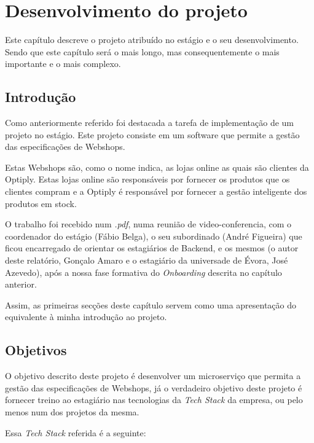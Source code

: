\chapter{Desenvolvimento do projeto}\label{cap4}

Este capítulo descreve o projeto atribuído no estágio e o seu desenvolvimento. Sendo que este capítulo será o mais longo, mas consequentemente o mais importante e o mais complexo.

\section{Introdução}

Como anteriormente referido foi destacada a tarefa de implementação de um projeto no estágio. Este projeto consiste em um software que permite a gestão das especificações de Webshops.

Estas Webshops são, como o nome indica, as lojas online as quais são clientes da Optiply. Estas lojas online são responsáveis por fornecer os produtos que os clientes compram e a Optiply é responsável por fornecer a gestão inteligente dos produtos em stock.

O trabalho foi recebido num \textit{.pdf}, numa reunião de video-conferencia, com o coordenador do estágio (Fábio Belga), o seu subordinado (André Figueira) que ficou encarregado de orientar os estagiários de Backend, e os mesmos (o autor deste relatório, Gonçalo Amaro e o estagiário da universade de Évora, José Azevedo), após a nossa fase formativa do \textit{Onboarding} descrita no capítulo anterior.

Assim, as primeiras secções deste capítulo servem como uma apresentação do equivalente à minha introdução ao projeto.

\section{Objetivos}

O objetivo descrito deste projeto é desenvolver um microserviço que permita a gestão das especificações de Webshops, já o verdadeiro objetivo deste projeto é fornecer treino ao estagiário nas tecnologias da \textit{Tech Stack} da empresa, ou pelo menos num dos projetos da mesma.

\newpage

Essa \textit{Tech Stack} referida é a seguinte:

